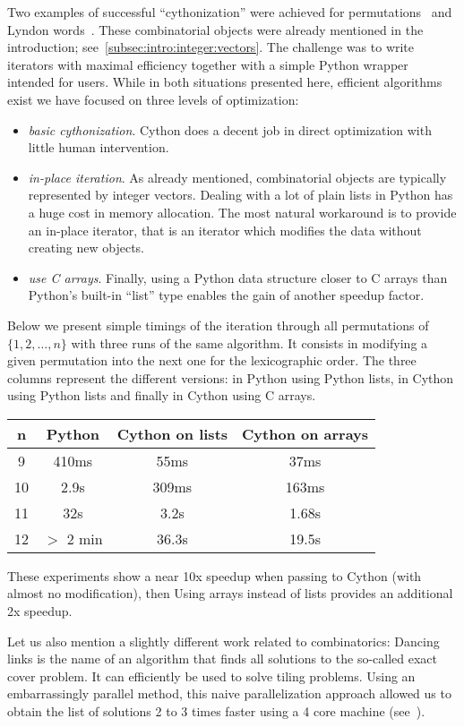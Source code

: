 \documentclass{deliverablereport}
\begin{document}
Two examples of successful ``cythonization'' were achieved for
permutations~\cite{trac-23734} and Lyndon words~\cite{trac-26111}.
These combinatorial objects were already mentioned in the
introduction; see~\ref{subsec:intro:integer:vectors}.
The challenge was to write iterators with maximal efficiency
together with a simple Python wrapper intended for \Sage users.
While in both situations presented here, efficient algorithms exist
we have focused on three levels of optimization:
\begin{itemize}
\item \textit{basic cythonization}. Cython does a decent job in
direct optimization with little human intervention. 
\item \textit{in-place iteration}. As already mentioned, combinatorial objects are typically represented by
integer vectors. Dealing with a lot of plain lists in Python has a huge
cost in memory allocation. The most natural workaround is to provide an in-place
iterator, that is an iterator which modifies the data without creating new objects.
\item \textit{use C arrays}. Finally, using a Python data structure closer to C
arrays than Python's built-in ``list'' type enables the gain of another speedup factor.
\end{itemize}
Below we present simple timings of the iteration through all permutations
of $\{1, 2, \ldots, n\}$ with three runs of the same algorithm. It consists
in modifying a given permutation into the next one for the lexicographic
order. The three columns represent the different versions: in Python
using Python lists, in Cython using Python lists and finally in Cython
using C arrays.
  \begin{center}
\begin{tabular}{c|c|c|c}
    n & Python & Cython on lists & Cython on arrays \\
\hline
9  & 410ms   & 55ms  & 37ms \\
10 & 2.9s    & 309ms & 163ms \\
11 & 32s     & 3.2s  & 1.68s \\
12 & $>$ 2 min & 36.3s & 19.5s \\
\end{tabular}
  \end{center}
These experiments show a near 10x speedup when passing to Cython (with almost no
modification), then Using arrays instead of lists provides an additional 2x speedup.

Let us also mention a slightly different work related to combinatorics:
Dancing links is the name of an algorithm that finds all solutions to
the so-called exact cover problem. It can efficiently be used to
solve tiling problems. Using an embarrassingly parallel method,
this naive parallelization approach allowed us to obtain the list
of solutions 2 to 3 times faster using a 4 core machine
(see~\cite{trac-25125}).
\end{document}

